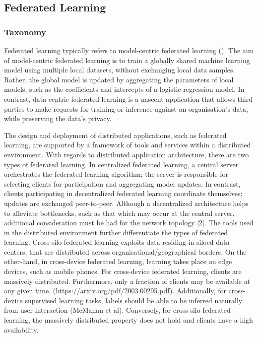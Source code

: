 \documentclass[letterpaper]{article} %
\begin{document}
\subsection{Federated Learning}

\subsubsection{Taxonomy} 

Federated learning typically refers to model-centric federated learning (). The aim of model-centric federated learning is to train a globally shared machine learning model using multiple local datasets, without exchanging local data samples. Rather, the global model is updated by aggregating the parameters of local models, such as the coefficients and intercepts of a logistic regression model. In contrast, data-centric federated learning is a nascent application that allows third parties to make requests for training or inference against an organisation's data, while preserving the data's privacy.

The design and deployment of distributed applications, such as federated learning, are supported by a framework of tools and services within a distributed environment. With regards to distributed application architecture, there are two types of federated learning. In centralized federated learning, a central server orchestrates the federated learning algorithm; the server is responsible for selecting clients for participation and aggregating model updates. In contrast, clients participating in decentralized federated learning coordinate themselves; updates are exchanged peer-to-peer. Although a decentralized architecture helps to alleviate bottlenecks, such as that which may occur at the central server, additional consideration must be had for the network topology [2]. The tools used in the distributed environment further differentiate the types of federated learning. Cross-silo federated learning exploits data residing in siloed data centers, that are distributed across organisational/geographical borders. On the other-hand, in cross-device federated learning, learning takes place on edge devices, such as mobile phones. For cross-device federated learning, clients are massively distributed. Furthermore, only a fraction of clients may be available at any given time. (https://arxiv.org/pdf/2003.00295.pdf). Additionally, for cross-device supervised learning tasks, labels should be able to be inferred naturally from user interaction (McMahan et al). Conversely, for cross-silo federated learning, the massively distributed property does not hold and clients have a high availability.
\end{document}
